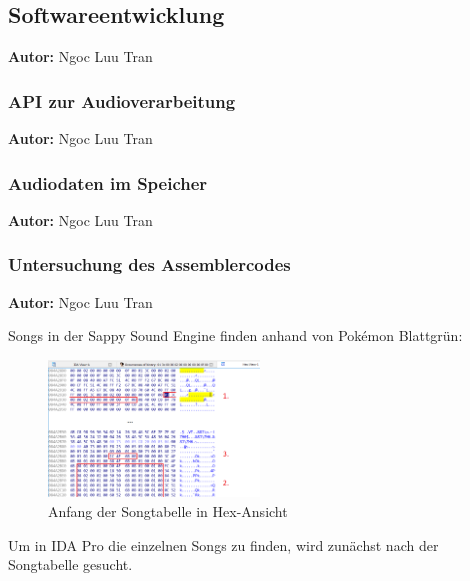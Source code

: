 \documentclass[11pt,a4paper]{scrartcl}
\newcommand{\AutorNgoc} {
    \vspace{-4mm}
    \large \textbf{Autor:} Ngoc Luu Tran \normalsize
    \vspace{2mm}
}
\begin{document}

\subsection{Softwareentwicklung}
\AutorNgoc



\subsubsection{API zur Audioverarbeitung}
\AutorNgoc




\subsubsection{Audiodaten im Speicher}
\AutorNgoc

\newpage

\subsubsection{Untersuchung des Assemblercodes}
\AutorNgoc

Songs in der Sappy Sound Engine finden anhand von Pok\'{e}mon Blattgr\"{u}n:

\begin{figure}
	\vspace{-10pt}
	\begin{center}
		\includegraphics[width=0.5\textwidth]{Songtabelle}
	\end{center}
	\vspace{-10pt}
	\caption{Anfang der Songtabelle in Hex-Ansicht}
	\label{fig:hex-view}
	\vspace{-30pt}
\end{figure}

Um in IDA Pro die einzelnen Songs zu finden, wird zun\"{a}chst nach der Songtabelle gesucht.
\end{document}
